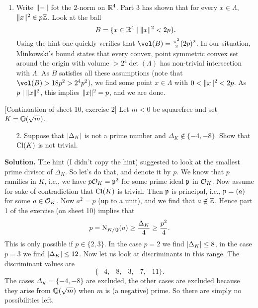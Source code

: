 \documentclass[a4paper,11pt]{article}
\begin{document}
\begin{enumerate}[wide,labelindent=0pt]
    \item Write $\lVert-\rVert$ fot the $2$-norm on $\mathbb{R}^4$. Part 3 has shown that 
        for every $x \in \Lambda$, $\lVert x\rVert^2 \in p \mathbb{Z}$. Look at the ball
        \begin{equation*}
            B = \{x \in \mathbb{R}^4 \mid \lVert x\rVert^2 < 2p\}.
        \end{equation*}
        Using the hint one quickly verifies that $\vol(B) = \frac{\pi^2}2 (2p)^2$.
        In our situation, Minkowski's bound states that every convex, point
        symmetric convex set around the origin with volume $> 2^4 \det(\Lambda)$
        has non-trivial intersection with $\Lambda$. As $B$ satisfies all these
        assumptions (note that $\vol(B) > 18p^2 > 2^4p^2$), we find some point
        $x \in \Lambda$ with $0 < \lVert x\rVert^2 < 2p$. As $p \mid \lVert x\rVert^2$, this 
        implies $\lVert x\rVert^2 = p$, and we are done.
\end{enumerate}

[Continuation of sheet 10, exercise 2] Let $m < 0$ be squarefree and set $K = \mathbb{Q}(\sqrt m)$. 
\begin{enumerate}
    \item[2.] Suppose that $\left\lvert \Delta_K \right\rvert$ is not a prime number and $\Delta_K 
        \not \in \{-4, -8\}$. Show that $\operatorname{Cl}(K)$ is not trivial.
\end{enumerate}
\textbf{Solution.}
The hint (I didn't copy the hint) suggested to look at the smallest prime divisor of
$\Delta_K$. So let's do that, and denote it by $p$. We know that $p$ ramifies in 
$K$, i.e., we have $p\mathcal{O}_K = \mathfrak{p}^2$ for some prime ideal $\mathfrak{p}$ in $\mathcal{O}_K$. Now
assume for sake of contradiction that $\operatorname{Cl}(K)$ is trivial. Then $\mathfrak{p}$ is principal, i.e.,
$\mathfrak{p}=(a)$ for some $a \in \mathcal{O}_K$. Now $a^2 = p$ (up to a unit), and we find
that $a \not \in \mathbb{Z}$. Hence part 1 of the exercise (on sheet 10) implies that
$$p = \operatorname{N}_{K/\mathbb{Q}}(a) \geq \frac{\Delta_K}4 \geq \frac{p^2}4.$$
This is only possible if $p \in \{2,3\}$. In the case $p=2$ we find
$\left\lvert \Delta_K \right\rvert \leq 8$, in the case $p=3$ we find $\left\lvert \Delta_K \right\rvert \leq 12$.
Now let us look at discriminants in this range.
The discriminant values are 
\begin{equation*}
    \{-4,-8,-3,-7,-11\}.
\end{equation*}
The cases $\Delta_K= \{-4, -8\}$ are excluded, the other cases are excluded because
they arise from $\mathbb{Q}(\sqrt m)$ when $m$ is (a negative) prime. So there are simply no
possibilities left.
\end{document}
